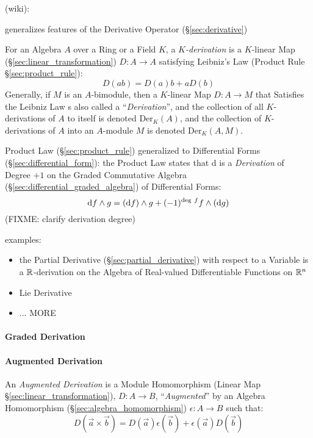 (wiki):

generalizes features of the Derivative Operator (\S\ref{sec:derivative})

For an Algebra $A$ over a Ring or a Field $K$, a \emph{$K$-derivation} is a
$K$-linear Map (\S\ref{sec:linear_transformation}) $D : A \rightarrow A$
satisfying Leibniz's Law (Product Rule \S\ref{sec:product_rule}):
\[
  D(ab) = D(a)b + aD(b)
\]
Generally, if $M$ is an $A$-bimodule, then a $K$-linear Map $D : A \rightarrow
M$ that Satisfies the Leibniz Law s also called a ``\emph{Derivation}'', and the
collection of all $K$-derivations of $A$ to itself is denoted
$\mathrm{Der}_K(A)$, and the collection of $K$-derivations of $A$ into an
$A$-module $M$ is denoted $\mathrm{Der}_K(A, M)$.

Product Law (\S\ref{sec:product_rule}) generalized to Differential Forms
(\S\ref{sec:differential_form}): the Product Law states that $\mathrm{d}$ is a
\emph{Derivation} of Degree $+1$ on the Graded Commutative Algebra
(\S\ref{sec:differential_graded_algebra}) of Differential Forms:
\[
\mathrm{d}f \wedge g = (\mathrm{d}f) \wedge g +
  (-1)^{\mathrm{deg}\ f}f \wedge (\mathrm{d}g)
\]
(FIXME: clarify derivation degree)

examples:
\begin{itemize}
  \item the Partial Derivative (\S\ref{sec:partial_derivative}) with respect to
    a Variable is a $\mathbb{R}$-derivation on the Algebra of Real-valued
    Differentiable Functions on $\mathbb{R}^n$
  \item Lie Derivative
  \item ... MORE
\end{itemize}



\paragraph{Graded Derivation}\label{sec:graded_derivation}\hfill

\paragraph{Augmented Derivation}\label{sec:augmented_derivation}\hfill

An \emph{Augmented Derivation} is a Module Homomorphism (Linear Map
\S\ref{sec:linear_transformation}), $D : A \rightarrow B$, ``\emph{Augmented}''
by an Algebra Homomorphism (\S\ref{sec:algebra_homomorphism})
$\epsilon : A \rightarrow B$ such that:
\[
  D(\vec{a} \times \vec{b}) =
  D(\vec{a})\epsilon(\vec{b}) + \epsilon(\vec{a})D(\vec{b})
\]

